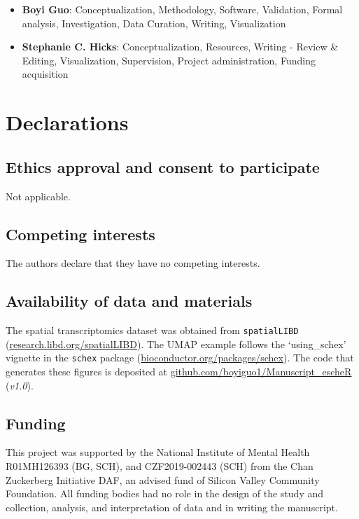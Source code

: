 \documentclass[10pt,twocolumn]{article}
\begin{document}
\begin{itemize}[nosep]
    \item \textbf{Boyi Guo}:  Conceptualization, Methodology, Software, Validation, Formal analysis, Investigation, Data Curation, Writing, Visualization
    \item \textbf{Stephanie C. Hicks}: Conceptualization, Resources, Writing - Review \& Editing, Visualization, Supervision, Project administration, Funding acquisition
\end{itemize}

\section*{Declarations}

\subsection*{Ethics approval and consent to participate}
Not applicable.

\subsection*{Competing interests}
The authors declare that they have no competing interests.

\subsection*{Availability of data and materials}
The spatial transcriptomics dataset was obtained from \texttt{spatialLIBD} (\href{http://research.libd.org/spatialLIBD}{research.libd.org/spatialLIBD}). The UMAP example follows the `using\_schex' vignette in the \texttt{schex} package (\href{https://www.bioconductor.org/packages/schex}{bioconductor.org/packages/schex}). The code that generates these figures is deposited at \href{https://github.com/boyiguo1/Manuscript_escheR}{github.com/boyiguo1/Manuscript\_escheR} (\textit{v1.0}).


\subsection*{Funding}
This project was supported by the National Institute of Mental Health R01MH126393 (BG, SCH), and CZF2019-002443 (SCH) from the Chan Zuckerberg Initiative DAF, an advised fund of Silicon Valley Community Foundation. All funding bodies had no role in the design of the study and collection, analysis, and interpretation of data and in writing the manuscript.
\end{document}
